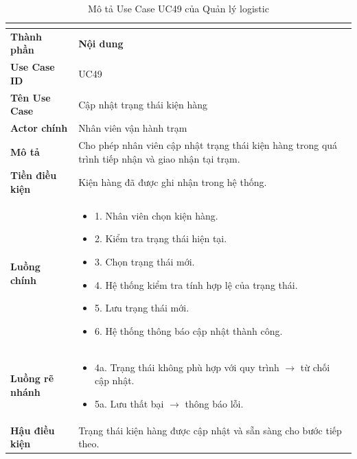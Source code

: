 \begin{longtable}{|C{3cm}|L{11cm}|}
\caption{Mô tả Use Case UC49 của Quản lý logistic}\\
\label{tab:mo-ta-uc49-quan-ly-logistic}\\
\hline
\textbf{Thành phần} & \textbf{Nội dung} \\
\hline
\textbf{Use Case ID} & UC49 \\
\hline
\textbf{Tên Use Case} & Cập nhật trạng thái kiện hàng \\
\hline
\textbf{Actor chính} & Nhân viên vận hành trạm \\
\hline
\textbf{Mô tả} & Cho phép nhân viên cập nhật trạng thái kiện hàng trong quá trình tiếp nhận và giao nhận tại trạm. \\
\hline
\textbf{Tiền điều kiện} & Kiện hàng đã được ghi nhận trong hệ thống. \\
\hline
\textbf{Luồng chính} &
\begin{itemize}[leftmargin=*,topsep=2pt,itemsep=2pt]
    \item 1. Nhân viên chọn kiện hàng.
    \item 2. Kiểm tra trạng thái hiện tại.
    \item 3. Chọn trạng thái mới.
    \item 4. Hệ thống kiểm tra tính hợp lệ của trạng thái.
    \item 5. Lưu trạng thái mới.
    \item 6. Hệ thống thông báo cập nhật thành công.
\end{itemize} \\
\hline
\textbf{Luồng rẽ nhánh} &
\begin{itemize}[leftmargin=*,topsep=2pt,itemsep=2pt]
    \item 4a. Trạng thái không phù hợp với quy trình $\rightarrow$ từ chối cập nhật.
    \item 5a. Lưu thất bại $\rightarrow$ thông báo lỗi.
\end{itemize} \\
\hline
\textbf{Hậu điều kiện} & Trạng thái kiện hàng được cập nhật và sẵn sàng cho bước tiếp theo. \\
\hline
\end{longtable}


